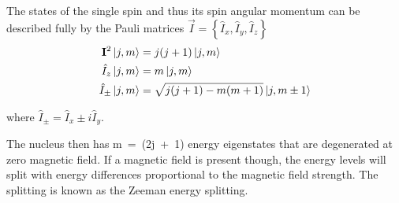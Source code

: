         The states of the single spin and thus its spin angular momentum can be described fully by the Pauli matrices $\vec{I} = \left\{ \hat{I}_x, \hat{I}_y, \hat{I}_z\right\}$\cite{pauli_zur_1988}
            \begin{align}
                \label{equ:theory:spinStates}
                \mathbf{I}^2 \ket{j,m} &= j(j+1)\ket{j,m}\\
                \hat{I}_z \ket{j,m} &= m\ket{j,m}\\
                \hat{I}_\pm \ket{j,m} &= \sqrt{j(j+1)-m(m+1)}\ket{j,m\pm1}
            \end{align}

            where $ \hat{I}_\pm = \hat{I}_x\pm i \hat{I}_y$.

        The nucleus then has m~=~(2j~+~1) energy eigenstates that are degenerated at zero magnetic field. If a magnetic field is present though, the energy levels will split with energy differences proportional to the magnetic field strength. The splitting is known as the Zeeman energy splitting.
